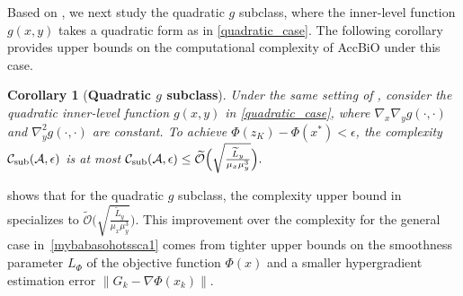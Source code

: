 \documentclass{osudissert96}
\newtheorem{corollary}{Corollary}
\begin{document}
Based on , we next study the quadratic $g$ subclass, where the inner-level function $g(x,y)$ takes a quadratic form as in \cref{quadratic_case}. 
The following corollary provides upper bounds on the computational complexity of AccBiO under this case.
\begin{corollary}[\bf Quadratic $g$ subclass]\label{coro:quadaticSr}
Under the same setting of , consider the quadratic inner-level function $g(x,y)$ in \cref{quadratic_case}, where $\nabla_x\nabla_y g(\cdot,\cdot)$ and $\nabla_y^2 g(\cdot,\cdot)$ are constant. To achieve $\Phi(z_K)- \Phi(x^*)<\epsilon$, 
the complexity $\mathcal{C}_{\text{\normalfont sub}}(\mathcal{A},\epsilon)$ is at most  
$\mathcal{C}_{\text{\normalfont sub}}(\mathcal{A},\epsilon)\leq \mathcal{\widetilde O}\Big(\sqrt{\frac{\widetilde L_y}{\mu_x\mu_y^{3}}}\Big).$
\end{corollary}
 shows that for the quadratic $g$ subclass, the complexity upper bound in  specializes to $\mathcal{\widetilde O}\Big(\sqrt{\frac{\widetilde L_y}{\mu_x\mu_y^{3}}}\Big)$. This improvement over the complexity for the general case in~\cref{mybabasohotssca1} comes from tighter upper bounds on the smoothness parameter $L_\Phi$ of the objective function $\Phi(x)$ and a smaller hypergradient estimation error $\|G_k-\nabla\Phi(x_k)\|$.  
\end{document}
